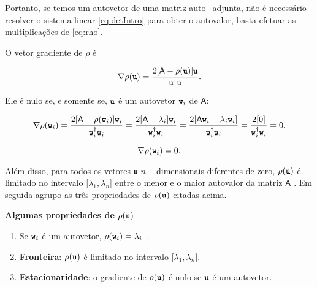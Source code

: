 	Portanto, se temos um autovetor de uma matriz auto$-$adjunta, não é necessário resolver o sistema linear \ref{eq:detIntro} para obter o autovalor, basta efetuar as multiplicações de \ref{eq:rho}.
	
	O vetor gradiente de $\rho$ é \cite{Wilkinson1965}
	
	\begin{equation}\label{eq:gradrho}
		\nabla \rho (\textbf{\texttt{u}}) = \frac{2[\mathsf{A} - \rho(\textbf{\texttt{u}})] \textbf{\texttt{u}}}{\textbf{\texttt{u}}^\dag \textbf{\texttt{u}}}.
	\end{equation}

	Ele é nulo se, e somente se, $\textbf{\texttt{u}}$ é um autovetor $\textbf{\texttt{w}}_i$  de $\mathsf{A}$:
	
	\begin{equation}\label{eq:grad_rho_no_w}
		\nabla \rho (\textbf{\texttt{w}}_i) = \frac{2[\mathsf{A} - \rho(\textbf{\texttt{w}}_i)] \textbf{\texttt{w}}_i}{\textbf{\texttt{w}}_i^\dag \textbf{\texttt{w}}_i} = \frac{2[\mathsf{A} - \lambda_i]\textbf{\texttt{w}}_i}{\textbf{\texttt{w}}_i^\dag \textbf{\texttt{w}}_i} = \frac{2[\mathsf{A}\textbf{\texttt{w}}_i - \lambda_i\textbf{\texttt{w}}_i]}{\textbf{\texttt{w}}_i^\dag \textbf{\texttt{w}}_i} = \frac{2[0]}{\textbf{\texttt{w}}_i^\dag \textbf{\texttt{w}}_i} = 0,
	\end{equation}
	
	\begin{equation}\label{eq:grad_rho_nulo}
		\nabla \rho (\textbf{\texttt{w}}_i) = 0.
	\end{equation}

Além disso, para todos os vetores \textbf{\texttt{u}} $n-$dimensionais diferentes de zero, $\rho(\textbf{\texttt{u}})$ é limitado no intervalo [$\lambda_1, \lambda_n$] entre o menor e o maior autovalor da matriz $\mathsf{A}$ \cite{Parlett1998}. Em seguida agrupo as três propriedades de $\rho(\textbf{\texttt{u}})$ citadas acima.

\textbf{Algumas propriedades de $\rho(\textbf{\texttt{u}})$}

\begin{enumerate}
		
	\item Se $\textbf{\texttt{w}}_i$ é um autovetor, $\rho(\textbf{\texttt{w}}_i) = \lambda_i$ .
	
	\item \textbf{Fronteira}: $\rho(\textbf{\texttt{u}})$ é limitado no intervalo [$\lambda_1, \lambda_n$].
	
	\item \textbf{Estacionaridade}: o gradiente de $\rho(\textbf{\texttt{u}})$ é nulo se $\textbf{\texttt{u}}$ é um autovetor.
	
\end{enumerate}


